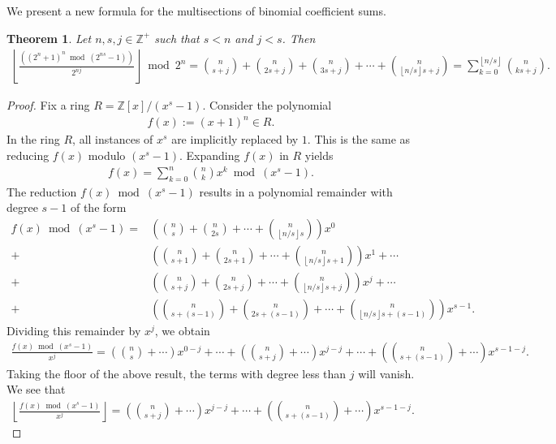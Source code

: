 \documentclass[10pt,a4paper]{article}
\theoremstyle{plain}
\newtheorem{theorem}{Theorem}[section]
\newcommand{\floor}[1]{\left\lfloor #1 \right\rfloor}
\newcommand{\Z}{\mathbb{Z}}
\begin{document}
We present a new formula for the multisections of binomial coefficient sums.

\begin{theorem}
Let $n,s,j \in \Z^+$ such that $s < n$ and $j < s$. Then
\begin{align*}
\floor{\frac{\left( (2^n+1)^n \bmod (2^{ns}-1) \right)}{2^{nj}}} \bmod 2^n
= \binom{n}{s+j} + \binom{n}{2s+j} + \binom{n}{3s+j} + \cdots + \binom{n}{\floor{n/s}s+j} = \sum_{k=0}^{\floor{n/s}} \binom{n}{ks+j} .
\end{align*}
\end{theorem}
\begin{proof}
Fix a ring $R = \Z[x]/(x^s-1)$. Consider the polynomial
\begin{align*}
f(x) := (x+1)^n \in R .
\end{align*}
In the ring $R$, all instances of $x^s$ are implicitly replaced by $1$. This is the same as reducing $f(x)$ modulo $(x^s-1)$. Expanding $f(x)$ in $R$ yields
\begin{align*}
f(x) = \sum_{k=0}^n \binom{n}{k} x^k \bmod(x^s-1) .
\end{align*}
The reduction $f(x) \bmod (x^s-1)$ results in a polynomial remainder with degree $s-1$ of the form
\begin{align*}
f(x) \bmod (x^s-1) = & \left(\binom{n}{s} + \binom{n}{2s} + \cdots + \binom{n}{\floor{n/s}s} \right) x^0 \\
+ & \left(\binom{n}{s+1} + \binom{n}{2s+1} + \cdots + \binom{n}{\floor{n/s}s+1} \right) x^1 + \cdots \\
+ & \left(\binom{n}{s+j} + \binom{n}{2s+j} + \cdots + \binom{n}{\floor{n/s}s+j} \right) x^j
+ \cdots \\
+ & \left(\binom{n}{s+(s-1)} + \binom{n}{2s+(s-1)} + \cdots + \binom{n}{\floor{n/s}s+(s-1)} \right) x^{s-1} .
\end{align*}
Dividing this remainder by $x^j$, we obtain
\begin{align*}
\frac{f(x) \bmod(x^s-1)}{x^j} = \left(\binom{n}{s} + \cdots \right) x^{0-j}
+ \cdots
+ \left(\binom{n}{s+j} + \cdots \right) x^{j-j}
+ \cdots
+ \left(\binom{n}{s+(s-1)} + \cdots \right) x^{s-1-j} .
\end{align*}
Taking the floor of the above result, the terms with degree less than $j$ will vanish. We see that
\begin{align*}
\floor{\frac{f(x) \bmod(x^s-1)}{x^j}}
= \left(\binom{n}{s+j} + \cdots \right) x^{j-j}
+ \cdots
+ \left(\binom{n}{s+(s-1)} + \cdots \right) x^{s-1-j} .
\end{align*}

\end{proof}
\end{document}
